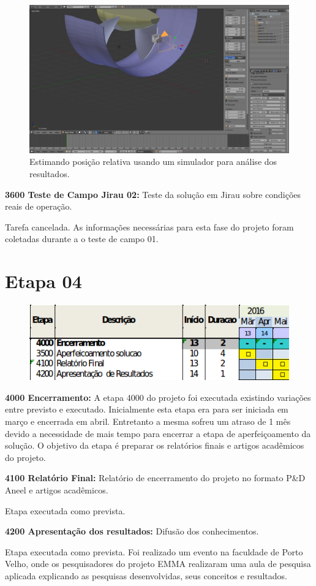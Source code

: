 \begin{figure}\centering
\includegraphics[width=0.9\columnwidth]{figs/blensor_screen}
\caption{Estimando posição relativa usando um simulador para análise dos
resultados.}
\end{figure} 


\textbf{3600 Teste de Campo Jirau 02:} Teste da solução  em Jirau sobre
condições reais de operação.

Tarefa cancelada. As informações necessárias para esta fase do
projeto foram coletadas durante a o teste de campo 01. 

\section{Etapa 04} 

\begin{figure}
\centering
\includegraphics[width=0.9\columnwidth]{figs/etapa4}
\end{figure} 

\textbf{4000 Encerramento:} A etapa 4000 do projeto foi executada existindo
variações entre previsto e executado. Inicialmente esta etapa era para ser
iniciada em março e encerrada em abril. Entretanto a mesma sofreu um atraso de 1
mês devido a necessidade de mais tempo para encerrar a etapa de aperfeiçoamento
da solução. O objetivo da etapa é preparar os relatórios finais e artigos acadêmicos do projeto.

\textbf{4100 Relatório Final:} Relatório de encerramento do projeto no formato
P\&D Aneel e artigos acadêmicos.

Etapa executada como prevista. 

\textbf{4200 Apresentação dos resultados:} Difusão dos conhecimentos.

Etapa executada como prevista. Foi realizado um evento na faculdade de Porto
Velho, onde os pesquisadores do projeto EMMA realizaram uma aula de pesquisa
aplicada explicando as pesquisas desenvolvidas, seus conceitos e resultados.
 